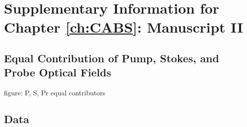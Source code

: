\chapter{Supplementary Information for Chapter \ref{ch:CABS}: Manuscript II}
\label{appendix: CABS}
\acresetall

\section{Equal Contribution of Pump, Stokes, and Probe Optical Fields}
figure: P, S, Pr equal contributors

\section{Data}
